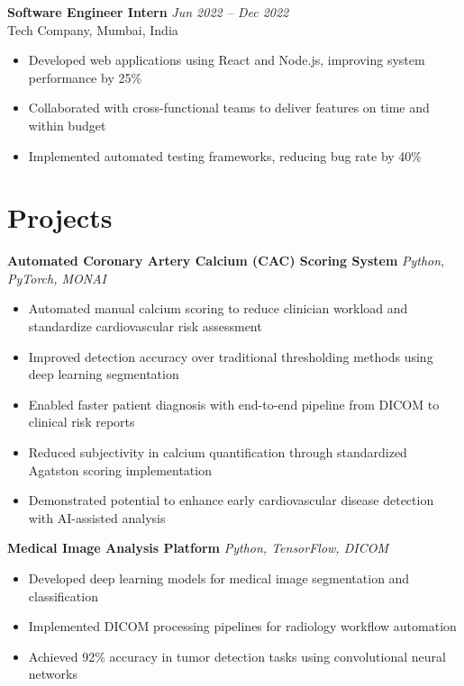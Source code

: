 \documentclass[11pt,a4paper]{article}
\begin{document}
\textbf{Software Engineer Intern} \hfill \textit{Jun 2022 -- Dec 2022} \\
Tech Company, Mumbai, India
\begin{itemize}
    \item Developed web applications using React and Node.js, improving system performance by 25\%
    \item Collaborated with cross-functional teams to deliver features on time and within budget
    \item Implemented automated testing frameworks, reducing bug rate by 40\%
\end{itemize}

\vspace{10pt}

\section{Projects}

\textbf{Automated Coronary Artery Calcium (CAC) Scoring System} \hfill \textit{Python, PyTorch, MONAI}
\begin{itemize}
    \item Automated manual calcium scoring to reduce clinician workload and standardize cardiovascular risk assessment
    \item Improved detection accuracy over traditional thresholding methods using deep learning segmentation
    \item Enabled faster patient diagnosis with end-to-end pipeline from DICOM to clinical risk reports
    \item Reduced subjectivity in calcium quantification through standardized Agatston scoring implementation
    \item Demonstrated potential to enhance early cardiovascular disease detection with AI-assisted analysis
\end{itemize}

\textbf{Medical Image Analysis Platform} \hfill \textit{Python, TensorFlow, DICOM}
\begin{itemize}
    \item Developed deep learning models for medical image segmentation and classification
    \item Implemented DICOM processing pipelines for radiology workflow automation
    \item Achieved 92\% accuracy in tumor detection tasks using convolutional neural networks
\end{itemize}
\end{document}
